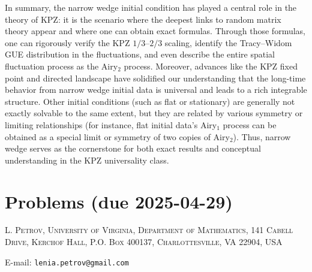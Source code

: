 \documentclass[letterpaper,11pt,oneside,reqno]{article}
\numberwithin{equation}{section}
\theoremstyle{definition}
\begin{document}
In summary, the narrow wedge initial condition has played a central role in the theory of KPZ: it is the scenario where the deepest links to random matrix theory appear and where one can obtain exact formulas. Through those formulas, one can rigorously verify the KPZ $1/3$–$2/3$ scaling, identify the Tracy–Widom GUE distribution in the fluctuations, and even describe the entire spatial fluctuation process as the Airy$_2$ process. Moreover, advances like the KPZ fixed point and directed landscape have solidified our understanding that the long-time behavior from narrow wedge initial data is universal and leads to a rich integrable structure. Other initial conditions (such as flat or stationary) are generally not exactly solvable to the same extent, but they are related by various symmetry or limiting relationships (for instance, flat initial data’s Airy$_1$ process can be obtained as a special limit or symmetry of two copies of Airy$_2$). Thus, narrow wedge serves as the cornerstone for both exact results and conceptual understanding in the KPZ universality class.



















\appendix
\setcounter{section}{11}

\section{Problems (due 2025-04-29)}









\medskip

\textsc{L. Petrov, University of Virginia, Department of Mathematics, 141 Cabell Drive, Kerchof Hall, P.O. Box 400137, Charlottesville, VA 22904, USA}

E-mail: \texttt{lenia.petrov@gmail.com}
\end{document}

